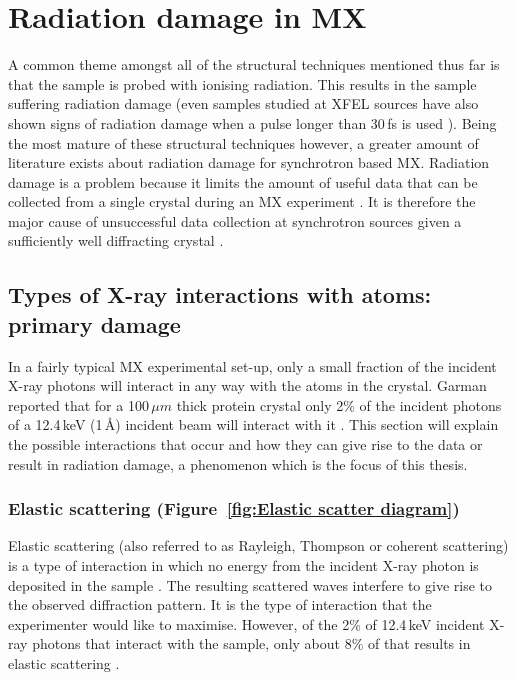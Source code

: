 \section{Radiation damage in MX}
\label{sec:Radiation damage in MX}
    A common theme amongst all of the structural techniques mentioned thus far is that the sample is probed with ionising radiation.
    This results in the sample suffering radiation damage (even samples studied at XFEL sources have also shown signs of radiation damage when a pulse longer than 30$\,$fs is used \cite{nass2015indications}).
    Being the most mature of these structural techniques however, a greater amount of literature exists about radiation damage for synchrotron based MX.
    Radiation damage is a problem because it limits the amount of useful data that can be collected from a single crystal during an MX experiment \cite{garman2010}.
    It is therefore the major cause of unsuccessful data collection at synchrotron sources given a sufficiently well diffracting crystal \cite{zeldin2013dwd}.

    \subsection{Types of X-ray interactions with atoms: primary damage}
    \label{sub:Types of X-ray interactions with atoms: Primary damage}
        In a fairly typical MX experimental set-up, only a small fraction of the incident X-ray photons will interact in any way with the atoms in the crystal.
        Garman reported that for a 100$\,\mu m$ thick protein crystal only 2\% of the incident photons of a 12.4$\,$keV (1$\,$\AA) incident beam will interact with it \cite{garman2010}.
        This section will explain the possible interactions that occur and how they can give rise to the data or result in radiation damage, a phenomenon which is the focus of this thesis.

        \subsubsection{Elastic scattering (Figure~\ref{fig:Elastic scatter diagram})}
        \label{subs:Elastic scattering}
            Elastic scattering (also referred to as Rayleigh, Thompson or coherent scattering) is a type of interaction in which no energy from the incident X-ray photon is deposited in the sample \cite{nave1995}.
            The resulting scattered waves interfere to give rise to the observed diffraction pattern.
            It is the type of interaction that the experimenter would like to maximise.
            However, of the 2\% of 12.4$\,$keV incident X-ray photons that interact with the sample, only about 8\% of that results in elastic scattering \cite{ravelli2006radiation}.


